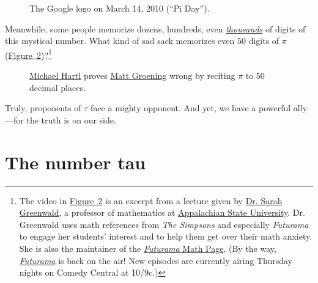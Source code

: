 \documentclass{article}
\begin{document}
\begin{figure}
\begin{center}
\end{center}
\caption{The Google logo on March 14, 2010 (``Pi Day'').\label{fig:google_pi_day.}}
\end{figure}

Meanwhile, some people memorize dozens, hundreds, even \href{http://en.wikipedia.org/wiki/Lu_Chao}{\emph{thousands}} of digits of this mystical number. What kind of sad sack memorizes even 50 digits of $\pi$ (\hyperref[fig:futurama_video]{Figure~}\ref{fig:futurama_video})?\footnote{The video in \hyperref[fig:futurama_video]{Figure~}\ref{fig:futurama_video} is an excerpt from a lecture given by \href{http://mathsci.appstate.edu/~sjg/}{Dr. Sarah Greenwald}, a professor of mathematics at \href{http://www.appstate.edu/}{Appalachian State University}. Dr. Greenwald uses math references from \emph{The Simpsons} and especially \emph{Futurama} to engage her students' interest and to help them get over their math anxiety. She is also the maintainer of the \href{http://www.futuramamath.com/}{\emph{Futurama} Math Page}. (By the way, \href{http://www.comedycentral.com/shows/futurama/index.jhtml}{\emph{Futurama}} is back on the air! New episodes are currently airing Thursday nights on Comedy Central at 10/9c.)}

\begin{figure}
\begin{center}
\end{center}
\caption{\href{\#sec:about_the_author}{Michael Hartl} proves \href{http://en.wikipedia.org/wiki/Matt_Groening}{Matt Groening} wrong by reciting $\pi$ to 50 decimal places.\label{fig:futurama_video}}
\end{figure}

Truly, proponents of $\tau$ face a mighty opponent. And yet, we have a powerful ally---for the truth is on our side.


\section{The number tau} %
\label{sec:the_number_tau}
\end{document}
